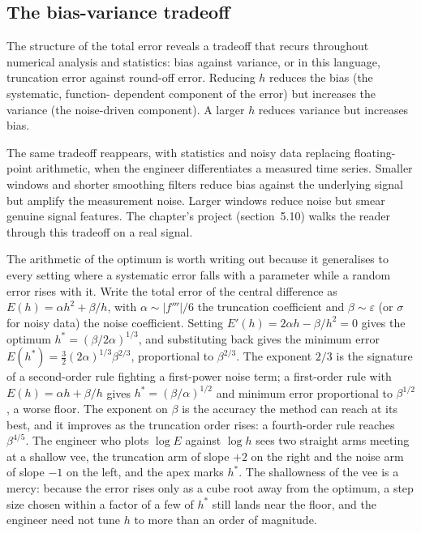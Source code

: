 \subsection{The bias-variance tradeoff}

The structure of the total error reveals a tradeoff that recurs
throughout numerical analysis and statistics: bias against
variance, or in this language, truncation error against round-off
error. Reducing $h$ reduces the bias (the systematic, function-
dependent component of the error) but increases the variance (the
noise-driven component). A larger $h$ reduces variance but
increases bias.

The same tradeoff reappears, with statistics and noisy data
replacing floating-point arithmetic, when the engineer differentiates
a measured time series. Smaller windows and shorter smoothing
filters reduce bias against the underlying signal but amplify the
measurement noise. Larger windows reduce noise but smear
genuine signal features. The chapter's project (section~5.10)
walks the reader through this tradeoff on a real signal.

The arithmetic of the optimum is worth writing out because it
generalises to every setting where a systematic error falls with a
parameter while a random error rises with it. Write the total error
of the central difference as $E(h) = \alpha h^{2} + \beta/h$, with
$\alpha \sim |f'''|/6$ the truncation coefficient and $\beta \sim
\varepsilon$ (or $\sigma$ for noisy data) the noise coefficient.
Setting $E'(h) = 2\alpha h - \beta/h^{2} = 0$ gives the optimum
$h^{*} = (\beta/2\alpha)^{1/3}$, and substituting back gives the
minimum error $E(h^{*}) = \tfrac{3}{2}(2\alpha)^{1/3}\beta^{2/3}$,
proportional to $\beta^{2/3}$. The exponent $2/3$ is the signature of
a second-order rule fighting a first-power noise term; a first-order
rule with $E(h) = \alpha h + \beta/h$ gives $h^{*} =
(\beta/\alpha)^{1/2}$ and minimum error proportional to
$\beta^{1/2}$, a worse floor. The exponent on $\beta$ is the accuracy
the method can reach at its best, and it improves as the truncation
order rises: a fourth-order rule reaches $\beta^{4/5}$. The engineer
who plots $\log E$ against $\log h$ sees two straight arms meeting at
a shallow vee, the truncation arm of slope $+2$ on the right and the
noise arm of slope $-1$ on the left, and the apex marks $h^{*}$. The
shallowness of the vee is a mercy: because the error rises only as a
cube root away from the optimum, a step size chosen within a factor of
a few of $h^{*}$ still lands near the floor, and the engineer need not
tune $h$ to more than an order of magnitude.

